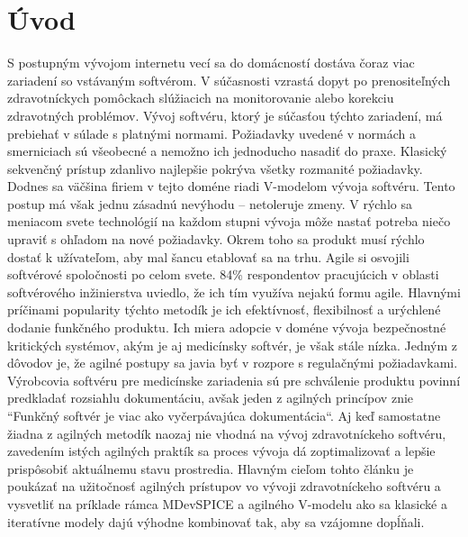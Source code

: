 \documentclass[10pt,twoside,slovak,a4paper]{article}
\begin{document}
\section{Úvod} %
S postupným vývojom internetu vecí sa do domácností dostáva čoraz viac zariadení so vstávaným softvérom. V súčasnosti vzrastá dopyt po prenositeľných zdravotníckych pomôckach slúžiacich na monitorovanie alebo korekciu zdravotných problémov. Vývoj softvéru, ktorý je súčasťou týchto zariadení, má prebiehať v súlade s platnými normami. Požiadavky uvedené v normách a smerniciach sú všeobecné a nemožno ich jednoducho nasadiť do praxe. Klasický sekvenčný prístup zdanlivo najlepšie pokrýva všetky rozmanité požiadavky. Dodnes sa väčšina firiem v tejto doméne riadi V-modelom vývoja softvéru\cite{mchugh2013}. Tento postup má však jednu zásadnú nevýhodu – netoleruje zmeny. V rýchlo sa meniacom svete technológií na každom stupni vývoja môže nastať potreba niečo upraviť s ohľadom na nové požiadavky. Okrem toho sa produkt musí rýchlo dostať k užívateľom, aby mal šancu etablovať sa na trhu. 
Agile si osvojili softvérové spoločnosti po celom svete. 84\% respondentov pracujúcich v oblasti softvérového inžinierstva uviedlo, že ich tím využíva nejakú formu agile. Hlavnými príčinami popularity týchto metodík je ich efektívnosť, flexibilnosť a urýchlené dodanie funkčného produktu\cite{agile}. Ich miera adopcie v doméne vývoja bezpečnostné kritických systémov, akým je aj medicínsky softvér, je však stále nízka\cite{mchugh2013}. Jedným z dôvodov je, že agilné postupy sa javia byť v rozpore s regulačnými požiadavkami. Výrobcovia softvéru pre medicínske zariadenia sú pre schválenie produktu povinní predkladať rozsiahlu dokumentáciu, avšak jeden z agilných princípov znie “Funkčný softvér je viac ako vyčerpávajúca dokumentácia“. Aj keď samostatne žiadna z agilných metodík naozaj nie vhodná na vývoj zdravotníckeho softvéru, zavedením istých agilných praktík sa proces vývoja dá zoptimalizovať a lepšie prispôsobiť aktuálnemu stavu prostredia. Hlavným cieľom tohto článku je poukázať na užitočnosť agilných prístupov vo vývoji zdravotníckeho softvéru a vysvetliť na príklade rámca MDevSPICE a agilného V-modelu ako sa klasické a iteratívne modely dajú výhodne kombinovať tak, aby sa vzájomne dopĺňali. 
\end{document}
